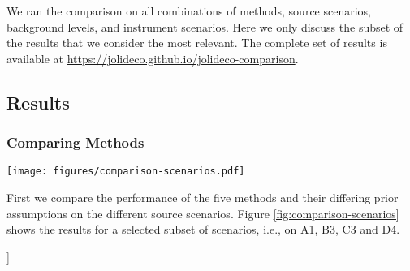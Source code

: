 \documentclass[twocolumn]{aastex631}
\DeclareMathOperator{\arcsinh}{arcsinh}
\newcommand{\jolideconospace}{\textit{Jolideco}}
\begin{document}
    We ran the comparison on all combinations of methods, source scenarios, background levels, and instrument scenarios. Here we only discuss the subset of the results that we consider the most relevant. The complete set of results is available at \url{https://jolideco.github.io/jolideco-comparison}.

    \subsection{Results}
    \subsubsection{Comparing Methods}
    \begin{figure*}
        \begin{centering}
            \texttt{[image: figures/comparison-scenarios.pdf]}
            \caption{
                Comparison of the different deconvolution methods and prior assumptions for selected source scenarios, as described in Section~\ref{subsec:test-datasets}. The simulations depicted used a fixed background level of $\lambda_{Bkg} = \qty[mode = math]{0.01}{cts/pix}$, a uniform exposure, and a Gaussian PSF of width $\sigma_{PSF} = \qty[mode = math]{2}{pix}$, corresponding to the \enquote{Chandra} instrument scenario. The leftmost column shows the simulated counts and the second column shows the underlying ground truth. The remaining columns show the reconstructed flux for each method and prior assumptions for \jolideconospace. To enhance weak structures the images use an $\arcsinh$ stretching with a scale parameter of $a=0.02$. The stretching is the same for all images. The methods are described in detail in Section~\ref{subsec:methods}. A more detailed representation of the results is available at \url{https://jolideco.github.io/jolideco-comparison}.
            }
            \label{fig:comparison-scenarios}
        \end{centering}
    \end{figure*}
    First we compare the performance of the five methods and their differing prior assumptions on the different source scenarios. Figure \ref{fig:comparison-scenarios} shows the results for a selected subset of scenarios, i.e., on A1, B3, C3 and D4. 

    ]
    \begin{table*}
    \centering
        \begin{tabular}{ c|c|c|c|c|c } 
            
        \end{tabular}
        \label{tab:metrics}
        \caption{Image metrics for the difference source scenarios and methods.}
    \end{table*}
    
\end{document}
